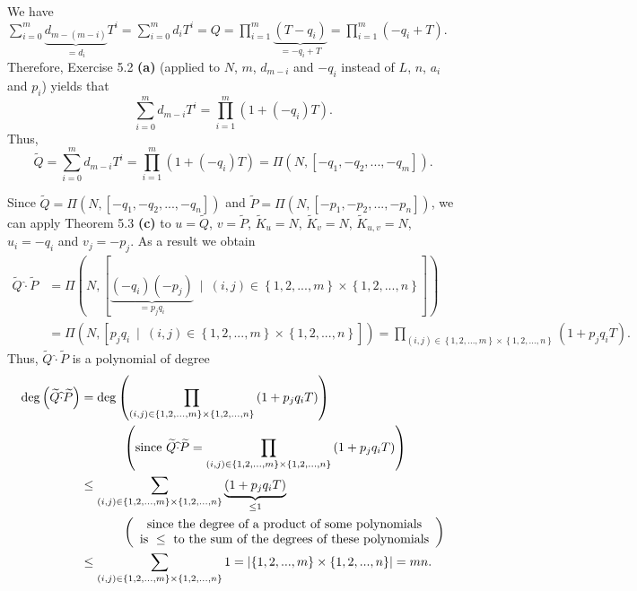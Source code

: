 \documentclass[numbers=enddot,12pt,final,onecolumn,notitlepage]{scrartcl}%
\begin{document}
We have $\sum\limits_{i=0}^{m}\underbrace{d_{m-\left(  m-i\right)  }}_{=d_{i}%
}T^{i}=\sum\limits_{i=0}^{m}d_{i}T^{i}=Q=\prod\limits_{i=1}^{m}%
\underbrace{\left(  T-q_{i}\right)  }_{=-q_{i}+T}=\prod\limits_{i=1}%
^{m}\left(  -q_{i}+T\right)  $. Therefore, Exercise 5.2 \textbf{(a)} (applied
to $N$, $m$, $d_{m-i}$ and $-q_{i}$ instead of $L$, $n$, $a_{i}$ and $p_{i}$)
yields that%
\[
\sum\limits_{i=0}^{m}d_{m-i}T^{i}=\prod\limits_{i=1}^{m}\left(  1+\left(
-q_{i}\right)  T\right)  .
\]
Thus,%
\[
\widetilde{Q}=\sum\limits_{i=0}^{m}d_{m-i}T^{i}=\prod\limits_{i=1}^{m}\left(
1+\left(  -q_{i}\right)  T\right)  =\Pi\left(  N,\left[  -q_{1},-q_{2}%
,...,-q_{m}\right]  \right)  .
\]


Since $\widetilde{Q}=\Pi\left(  N,\left[  -q_{1},-q_{2},...,-q_{n}\right]
\right)  $ and $\widetilde{P}=\Pi\left(  N,\left[  -p_{1},-p_{2}%
,...,-p_{n}\right]  \right)  $, we can apply Theorem 5.3 \textbf{(c)} to
$u=\widetilde{Q}$, $v=\widetilde{P}$, $\widetilde{K}_{u}=N$, $\widetilde{K}%
_{v}=N$, $\widetilde{K}_{u,v}=N$, $u_{i}=-q_{i}$ and $v_{j}=-p_{j}$. As a
result we obtain%
\begin{align*}
\widetilde{Q}\widehat{\cdot}\widetilde{P}  &  =\Pi\left(  N,\left[
\underbrace{\left(  -q_{i}\right)  \left(  -p_{j}\right)  }_{=p_{j}q_{i}%
}\ \mid\ \left(  i,j\right)  \in\left\{  1,2,...,m\right\}  \times\left\{
1,2,...,n\right\}  \right]  \right) \\
&  =\Pi\left(  N,\left[  p_{j}q_{i}\ \mid\ \left(  i,j\right)  \in\left\{
1,2,...,m\right\}  \times\left\{  1,2,...,n\right\}  \right]  \right)
=\prod\limits_{\left(  i,j\right)  \in\left\{  1,2,...,m\right\}
\times\left\{  1,2,...,n\right\}  }\left(  1+p_{j}q_{i}T\right)  .
\end{align*}
Thus, $\widetilde{Q}\widehat{\cdot}\widetilde{P}$ is a polynomial of degree%
\begin{align*}
\deg\left(  \widetilde{Q}\widehat{\cdot}\widetilde{P}\right)   &  =\deg\left(
\prod\limits_{\left(  i,j\right)  \in\left\{  1,2,...,m\right\}
\times\left\{  1,2,...,n\right\}  }\left(  1+p_{j}q_{i}T\right)  \right) \\
&  \ \ \ \ \ \ \ \ \ \ \left(  \text{since }\widetilde{Q}\widehat{\cdot
}\widetilde{P}=\prod\limits_{\left(  i,j\right)  \in\left\{
1,2,...,m\right\}  \times\left\{  1,2,...,n\right\}  }\left(  1+p_{j}%
q_{i}T\right)  \right) \\
&  \leq\sum\limits_{\left(  i,j\right)  \in\left\{  1,2,...,m\right\}
\times\left\{  1,2,...,n\right\}  }\underbrace{\left(  1+p_{j}q_{i}T\right)
}_{\leq1}\\
&  \ \ \ \ \ \ \ \ \ \ \left(
\begin{array}
[c]{c}%
\text{since the degree of a product of some polynomials}\\
\text{is }\leq\text{ to the sum of the degrees of these polynomials}%
\end{array}
\right) \\
&  \leq\sum\limits_{\left(  i,j\right)  \in\left\{  1,2,...,m\right\}
\times\left\{  1,2,...,n\right\}  }1=\left\vert \left\{  1,2,...,m\right\}
\times\left\{  1,2,...,n\right\}  \right\vert =mn.
\end{align*}
\end{document}
